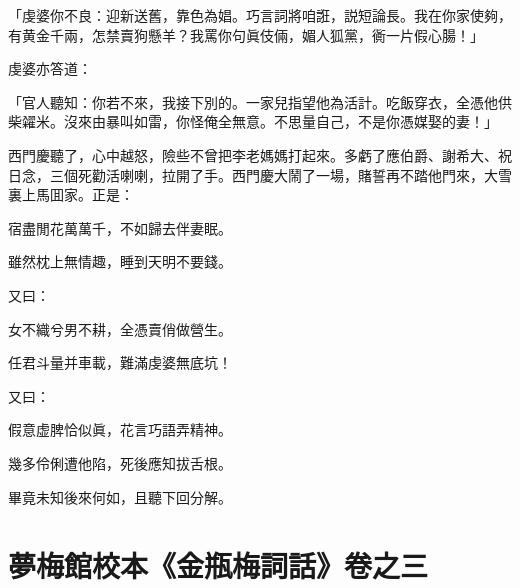 \begin{myquote}
「虔婆你不良：迎新送舊，靠色為娼。巧言詞將咱誑，説短論長。我在你家使夠，有黄金千兩，怎禁賣狗懸羊？我罵你句眞伎倆，媚人狐黨，衠一片假心腸！」
\end{myquote}

虔婆亦答道：

\begin{myquote}
「官人聽知：你若不來，我接下別的。一家兒指望他為活計。吃飯穿衣，全憑他供柴糴米。沒來由暴叫如雷，你怪俺全無意。不思量自己，不是你憑媒娶的妻！」
\end{myquote}

西門慶聽了，心中越怒，險些不曾把李老媽媽打起來。多虧了應伯爵、謝希大、祝日念，三個死勸活喇喇，拉開了手。西門慶大鬧了一場，賭誓再不踏他門來，大雪裏上馬囬家。正是：

\begin{myquote}
宿盡閒花萬萬千，不如歸去伴妻眠。

雖然枕上無情趣，睡到天明不要錢。
\end{myquote}

又曰：

\begin{myquote}
女不織兮男不耕，全憑賣俏做營生。

任君斗量并車載，難滿虔婆無底坑！
\end{myquote}

又曰：

\begin{myquote}
假意虚脾恰似眞，花言巧語弄精神。

幾多伶俐遭他陷，死後應知拔舌根。
\end{myquote}

畢竟未知後來何如，且聽下回分解。

\part*{夢梅館校本《金瓶梅詞話》卷之三}


